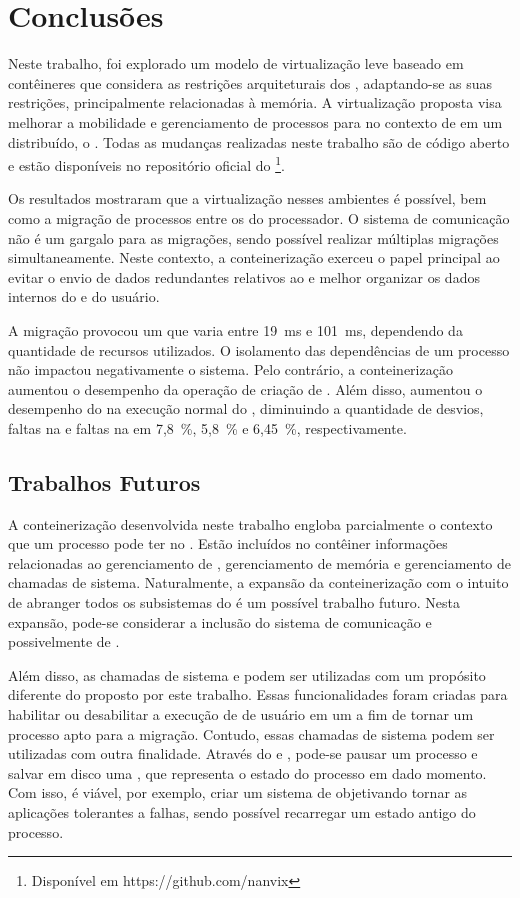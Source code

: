 \glsresetall
\chapter{Conclusões}
\label{chap.conclusions}

Neste trabalho, foi explorado um modelo de virtualização leve baseado em contêineres que considera as restrições arquiteturais dos \lws, adaptando-se as suas restrições, principalmente relacionadas à memória. A virtualização proposta visa melhorar a mobilidade e gerenciamento de processos para \lws no contexto de em um \os distribuído, o \nanvix. Todas as mudanças realizadas neste trabalho são de código aberto e estão disponíveis no repositório oficial do \nanvix\footnote{Disponível em https://github.com/nanvix}.
%

Os resultados mostraram que a virtualização nesses ambientes é possível, bem como a migração de processos entre os \clusters do processador. O sistema de comunicação não é um gargalo para as migrações, sendo possível realizar múltiplas migrações simultaneamente. Neste contexto, a conteinerização exerceu o papel principal ao evitar o envio de dados redundantes relativos ao  e melhor organizar os dados internos do  e do usuário. 

A migração provocou um \downtime que varia entre 19~ms e 101~ms, dependendo da quantidade de recursos utilizados. O isolamento das dependências de um processo não impactou negativamente o sistema. Pelo contrário, a conteinerização aumentou o desempenho da operação de criação de \threads. Além disso, aumentou o desempenho do  na execução normal do \so, diminuindo a quantidade de desvios, faltas na \dcache e faltas na \icache em 7,8~\%, 5,8~\% e 6,45~\%, respectivamente.

\section{Trabalhos Futuros}

A conteinerização desenvolvida neste trabalho engloba parcialmente o contexto que um processo pode ter no \nanvix. Estão incluídos no contêiner informações relacionadas ao gerenciamento de \threads, gerenciamento de memória e gerenciamento de chamadas de sistema. Naturalmente, a expansão da conteinerização com o intuito de abranger todos os subsistemas do \nanvix é um possível trabalho futuro. Nesta expansão, pode-se considerar a inclusão do sistema de comunicação e possivelmente de \tasks.

Além disso, as chamadas de sistema \freeze e \unfreeze podem ser utilizadas com um propósito diferente do proposto por este trabalho. Essas funcionalidades foram criadas para habilitar ou desabilitar a execução de \threads de usuário em um \cluster a fim de tornar um processo apto para a migração. Contudo, essas chamadas de sistema podem ser utilizadas com outra finalidade. Através do \freeze e \unfreeze, pode-se pausar um processo e salvar em disco uma \snapshot, que representa o estado do processo em dado momento. Com isso, é viável, por exemplo, criar um sistema de \checkpointing objetivando tornar as aplicações tolerantes a falhas, sendo possível recarregar um estado antigo do processo.

